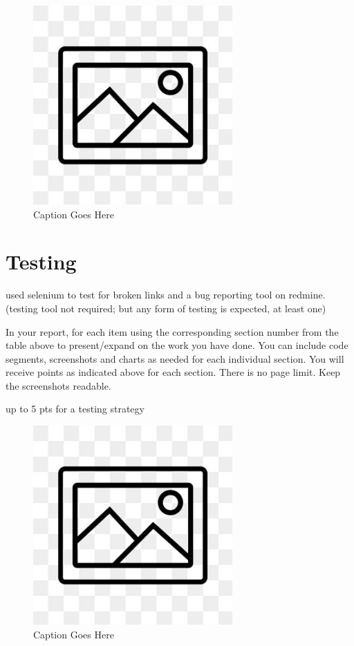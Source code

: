 \documentclass[12pt, letterpaper]{article}
\begin{document}
\begin{figure}[htbp]
	\centering
	\includegraphics[width=3in]{images/placeholder.jpg}
	\caption{Caption Goes Here}
 \end{figure}

 \newpage

\section{Testing}
used selenium to test for broken links and a bug reporting tool on redmine. (testing tool not required; but any form of testing is expected, at least one)

In your report, for each item using the corresponding section number from the table above to present/expand on the work you have done. You can include code segments, screenshots and charts as needed for each individual section. You will receive points as indicated above for each section. There is no page limit. Keep the screenshots readable.

up to 5 pts for a testing strategy

\begin{figure}[htbp]
	\centering
	\includegraphics[width=3in]{images/placeholder.jpg}
	\caption{Caption Goes Here}
 \end{figure}
\end{document}
